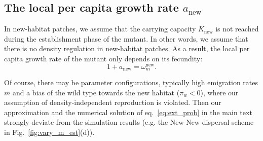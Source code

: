 \documentclass[11pt]{article}
\newcommand{\florence}[1]{\textcolor{purple}{(#1)}} %
\newcommand{\chg}[1]{\textcolor{change}{#1}}
\begin{document}

\subsection*{The local per capita growth rate $a_{\text{new}}$}
In new-habitat patches, we assume that the carrying capacity $K_{\text{new}}$ is not reached during the establishment phase of the mutant. In other words, we assume that there is no density regulation in new-habitat patches. As a result, the local per capita growth rate of the mutant only depends on its fecundity: 
%
\begin{equation}
1 + a_{\text{new}} = \omega_m^{\text{new}}.
\end{equation}


Of course, there may be parameter configurations, typically high emigration rates $m$ and a bias of the wild type towards the new habitat ($\pi_w < 0$), where our assumption of density-independent reproduction is violated. Then our approximation and the numerical solution of eq.~\eqref{eq:ext_prob} in the main text strongly deviate from the simulation results (e.g. the New-New dispersal scheme in Fig.~\ref{fig:vary_m_est}(d)).

\newpage
\renewcommand{\theequation}{B\arabic{equation}}
\setcounter{equation}{0}  %
\end{document}
